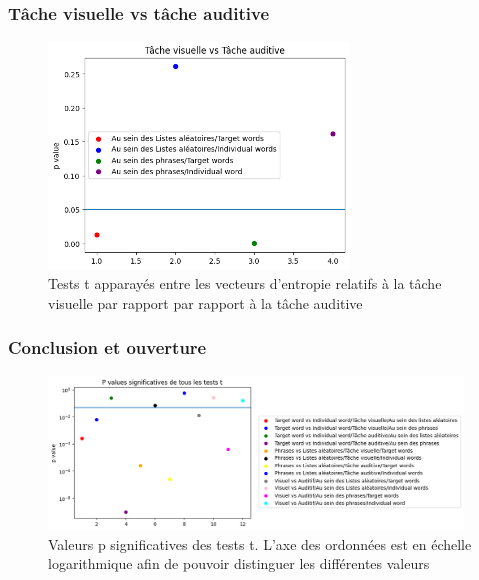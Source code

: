 \documentclass{beamer}
\begin{document}
\begin{frame}
\frametitle{Tâche visuelle vs tâche auditive}
\begin{figure}[!ht]
    \centering
    \includegraphics[width=8cm]{visuelle_vs_auditive.png}
    \caption{Tests t apparayés entre les vecteurs d'entropie relatifs à la tâche visuelle par rapport par rapport à la tâche auditive}
    \label{fig6.3}
\end{figure}
\end{frame}

\begin{frame}
\frametitle{Conclusion et ouverture}
\begin{figure}[!ht]
    \centering
    \includegraphics[width=11cm]{p_value_significative.png}
    \caption{Valeurs p significatives des tests t. L'axe des ordonnées est en échelle logarithmique afin de pouvoir distinguer les différentes valeurs}
    \label{fig6.4}
\end{figure}
\end{frame}
\end{document}

